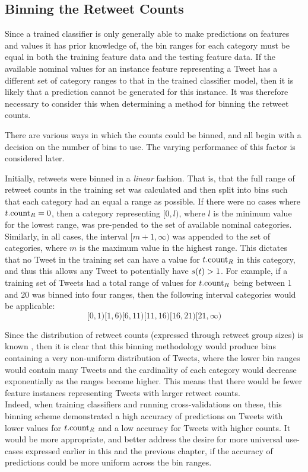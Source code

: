 \begin{enumerate}
\subsection{Binning the Retweet Counts}
Since a trained classifier is only generally able to make predictions on features and values it has prior knowledge of, the bin ranges for each category must be equal in both the training feature data and the testing feature data. If the available nominal values for an instance feature representing a Tweet has a different set of category ranges to that in the trained classifier model, then it is likely that a prediction cannot be generated for this instance. It was therefore necessary to consider this when determining a method for binning the retweet counts.

There are various ways in which the counts could be binned, and all begin with a decision on the number of bins to use. The varying performance of this factor is considered later.

Initially, retweets were binned in a \textit{linear} fashion. That is, that the full range of retweet counts in the training set was calculated and then split into bins such that each category had an equal a range as possible. If there were no cases where $t.\textrm{count}_R = 0$, then a category representing $[0,l)$, where $l$ is the minimum value for the lowest range, was pre-pended to the set of available nominal categories. Similarly, in all cases, the interval $[m+1,\infty)$ was appended to the set of categories, where $m$ is the maximum value in the highest range. This dictates that no Tweet in the training set can have a value for $t.\textrm{count}_R$ in this category, and thus this allows any Tweet to potentially have $s(t) > 1$. For example, if a training set of Tweets had a total range of values for $t.\textrm{count}_R$ being between 1 and 20 was binned into four ranges, then the following interval categories would be applicable:
\[
    [0,1) [1,6) [6,11) [11,16) [16,21) [21,\infty)
\]

Since the distribution of retweet counts (expressed through retweet group sizes) is known \cite{webberley11}, then it is clear that this binning methodology would produce bins containing a very non-uniform distribution of Tweets, where the lower bin ranges would contain many Tweets and the cardinality of each category would decrease exponentially as the ranges become higher. This means that there would be fewer feature instances representing Tweets with larger retweet counts.\\
 Indeed, when training classifiers and running cross-validations on these, this binning scheme demonstrated a high accuracy of predictions on Tweets with lower values for $t.\textrm{count}_R$ and a low accuracy for Tweets with higher counts. It would be more appropriate, and better address the desire for more universal use-cases expressed earlier in this and the previous chapter, if the accuracy of predictions could be more uniform across the bin ranges.


\end{enumerate}

